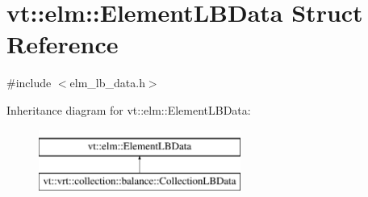 \hypertarget{structvt_1_1elm_1_1_element_l_b_data}{}\section{vt\+:\+:elm\+:\+:Element\+L\+B\+Data Struct Reference}
\label{structvt_1_1elm_1_1_element_l_b_data}


{\ttfamily \#include $<$elm\+\_\+lb\+\_\+data.\+h$>$}

Inheritance diagram for vt\+:\+:elm\+:\+:Element\+L\+B\+Data\+:\begin{figure}[H]
\begin{center}
\leavevmode
\includegraphics[height=2.000000cm]{structvt_1_1elm_1_1_element_l_b_data}
\end{center}
\end{figure}
